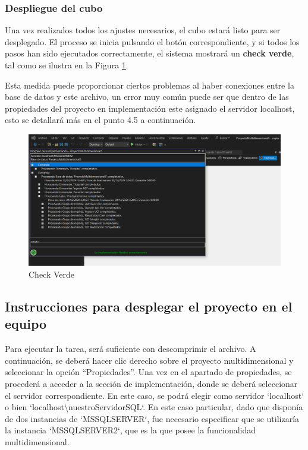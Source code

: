 \documentclass[12pt, a4paper, twoside]{article}
\begin{document}
\subsubsection{Despliegue del cubo}

Una vez realizados todos los ajustes necesarios, el cubo estará listo para ser desplegado. El proceso se inicia pulsando el botón correspondiente, y si todos los pasos han sido ejecutados correctamente, el sistema mostrará un \textbf{check verde}, tal como se ilustra en la Figura \ref{fig:31}.

Esta medida puede proporcionar ciertos problemas al haber conexiones entre la base de datos y este archivo, un error muy común puede ser que dentro de las propiedades del proyecto en implementación este asignado el servidor localhost, esto se detallará más en el punto 4.5 a continuación.
\begin{figure}[H]
	\centering
	\includegraphics[width=1\textwidth]{image/checkVerde}
	\caption{Check Verde}
	\label{fig:31}
\end{figure}


\subsection{Instrucciones para desplegar el proyecto en el equipo}
	 
	 Para ejecutar la tarea, será suficiente con descomprimir el archivo. A continuación, se deberá hacer clic derecho sobre el proyecto multidimensional y seleccionar la opción ``Propiedades''. Una vez en el apartado de propiedades, se procederá a acceder a la sección de implementación, donde se deberá seleccionar el servidor correspondiente. En este caso, se podrá elegir como servidor `localhost` o bien `localhost\textbackslash nuestroServidorSQL`. En este caso particular, dado que disponía de dos instancias de `MSSQLSERVER`, fue necesario especificar que se utilizaría la instancia `MSSQLSERVER2`, que es la que posee la funcionalidad multidimensional.
	 
\end{document}
